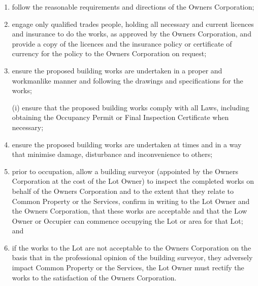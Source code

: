 \documentclass{article}
\begin{document}
\begin{enumerate}[label=\arabic*.]
\begin{enumerate}[label=\arabic{enumi}.\arabic*.]
\begin{enumerate}[label=\arabic{enumi}.\arabic*.]
\begin{enumerate}[label=(\arabic*)]
\begin{enumerate}[label=(\alph*)]
(ii) an estimated completion time for the works;

(iii) evidence or proof that any installation will not affect the external appearance of the Building or any Common Property or Services or the fire or acoustic ratings of any component of the
\newpage

Building; and

(iv) evidence that the building works will not affect the structural integrity of the Building.

\item  follow the reasonable requirements and directions of the Owners Corporation;

\item  engage only qualified trades people, holding all necessary and current licences and insurance to do the works, as approved by the Owners Corporation, and provide a copy of the licences and the insurance policy or certificate of currency for the policy to the Owners Corporation on request;

\item  ensure the proposed building works are undertaken in a proper and workmanlike manner and following the drawings and specifications for the works;

(i) ensure that the proposed building works comply with all Laws, including obtaining the Occupancy Permit or Final Inspection Certificate when necessary;

\item  ensure the proposed building works are undertaken at times and in a way that minimise damage, disturbance and inconvenience to others;

\item  prior to occupation, allow a building surveyor (appointed by the Owners Corporation at the cost of the Lot Owner) to inspect the completed works on behalf of the Owners Corporation and to the extent that they relate to Common Property or the Services, confirm in writing to the Lot Owner and the Owners Corporation, that these works are acceptable and that the Low Owner or Occupier can commence occupying the Lot or area for that Lot; and

\item  if the works to the Lot are not acceptable to the Owners Corporation on the basis that in the professional opinion of the building surveyor, they adversely impact Common Property or the Services, the Lot Owner must rectify the works to the satisfaction of the Owners Corporation.


\end{enumerate}
\end{enumerate}
\end{enumerate}
\end{enumerate}
\end{enumerate}
\end{document}
